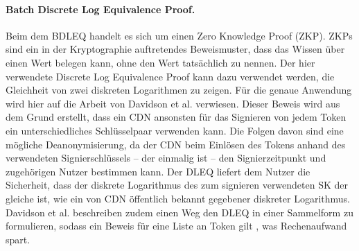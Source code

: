 \documentclass[
	fontsize=11pt,
	headings=small,
	parskip=half,           %
	bibliography=totoc,
	numbers=noenddot,       %
	open=any,               %
]{scrreprt}
\begin{document}
\paragraph{Batch Discrete Log Equivalence Proof.}
Beim dem BDLEQ handelt es sich um einen Zero Knowledge Proof (ZKP). ZKPs sind ein in der Kryptographie auftretendes Beweismuster, dass das Wissen über einen Wert belegen kann, ohne den Wert tatsächlich zu nennen. Der hier verwendete Discrete Log Equivalence Proof kann dazu verwendet werden, die Gleichheit von zwei diskreten Logarithmen zu zeigen. Für die genaue Anwendung wird hier auf die Arbeit von Davidson et al. \cite{pp-davidson2018privacy} verwiesen. Dieser Beweis wird aus dem Grund erstellt, dass ein CDN ansonsten für das Signieren von jedem Token ein unterschiedliches Schlüsselpaar verwenden kann. Die Folgen davon sind eine mögliche Deanonymisierung, da der CDN beim Einlösen des Tokens anhand des verwendeten Signierschlüssels -- der einmalig ist -- den Signierzeitpunkt und zugehörigen Nutzer bestimmen kann. Der DLEQ liefert dem Nutzer die Sicherheit, dass der diskrete Logarithmus des zum signieren verwendeten SK der gleiche ist, wie ein von CDN öffentlich bekannt gegebener diskreter Logarithmus. Davidson et al. beschreiben zudem einen Weg den DLEQ in einer Sammelform zu formulieren, sodass ein Beweis für eine Liste an Token gilt \cite{pp-davidson2018privacy}, was Rechenaufwand spart.
\end{document}
